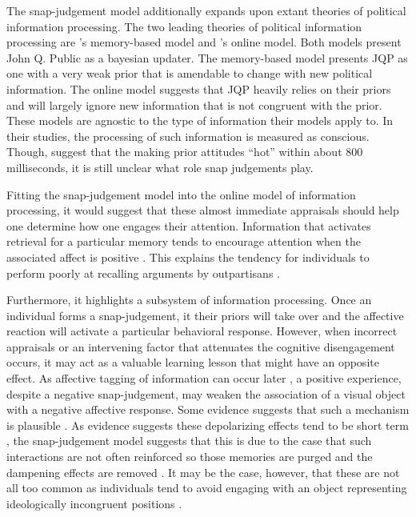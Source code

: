 \documentclass [12pt]{article}
\begin{document}
The snap-judgement model additionally expands upon extant theories of political information processing. The two leading theories of political information processing are \citeauthor{zaller_1992}'s \citeyearpar{zaller_1992} memory-based model and \citeauthor{taber_lodge_2006}'s \citeyearpar{taber_lodge_2006} online model. Both models present John Q. Public as a bayesian updater. The memory-based model presents JQP as one with a very weak prior that is amendable to change with new political information. The online model suggests that JQP heavily relies on their priors and will largely ignore new information that is not congruent with the prior. These models are agnostic to the type of information their models apply to. In their studies, the processing of such information is measured as conscious. Though, \citet{taber_lodge_2006} suggest that the making prior attitudes ``hot'' within about 800 milliseconds, it is still unclear what role snap judgements play. 

Fitting the snap-judgement model into the online model of information processing, it would suggest that these almost immediate appraisals should help one determine how one engages their attention. Information that activates retrieval for a particular memory tends to encourage attention when the associated affect is positive \citep{kensinger_fields_2022_ohhum}. This explains the tendency for individuals to perform poorly at recalling arguments by outpartisans \citep{lodge_et-al_1995}. 

Furthermore, it highlights a subsystem of information processing. Once an individual forms a snap-judgement, it their priors will take over and the affective reaction will activate a particular behavioral response. However, when incorrect appraisals or an intervening factor that attenuates the cognitive disengagement occurs, it may act as a valuable learning lesson that might have an opposite effect. As affective tagging of information can occur later \citep{kensinger_fields_2022_ohhum}, a positive experience, despite a negative snap-judgement, may weaken the association of a visual object with a negative affective response. Some evidence suggests that such a mechanism is plausible \citep{santoro_broockman_2022_sa}. As evidence suggests these depolarizing effects tend to be short term \citep{santoro_broockman_2022_sa}, the snap-judgement model suggests that this is due to the case that such interactions are not often reinforced so those memories are purged and the dampening effects are removed \citep[see][]{kahana_et-al_2022_ohhum}. It may be the case, however, that these are not all too common as individuals tend to avoid engaging with an object representing ideologically incongruent positions \citep[see][]{mutz_2006, klar_krupnikov_2016}.
\end{document}
